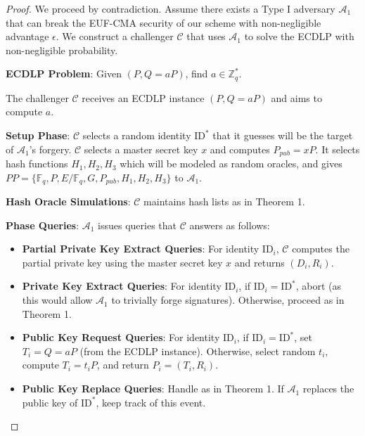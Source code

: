 \documentclass[10pt]{article}
\newtheorem{proof}{Proof}
\begin{document}
\begin{proof}
We proceed by contradiction. Assume there exists a Type I adversary $\mathcal{A}_1$ that can break the EUF-CMA security of our scheme with non-negligible advantage $\epsilon$. We construct a challenger $\mathcal{C}$ that uses $\mathcal{A}_1$ to solve the ECDLP with non-negligible probability.

\textbf{ECDLP Problem}: Given $(P, Q = aP)$, find $a \in \mathbb{Z}_q^*$.

The challenger $\mathcal{C}$ receives an ECDLP instance $(P, Q = aP)$ and aims to compute $a$.

\textbf{Setup Phase}:
$\mathcal{C}$ selects a random identity $\text{ID}^*$ that it guesses will be the target of $\mathcal{A}_1$'s forgery. $\mathcal{C}$ selects a master secret key $x$ and computes $P_{pub} = xP$. It selects hash functions $H_1, H_2, H_3$ which will be modeled as random oracles, and gives $PP = \{\mathbb{F}_q, P, E/\mathbb{F}_q, G, P_{pub}, H_1, H_2, H_3\}$ to $\mathcal{A}_1$.

\textbf{Hash Oracle Simulations}:
$\mathcal{C}$ maintains hash lists as in Theorem 1.

\textbf{Phase Queries}:
$\mathcal{A}_1$ issues queries that $\mathcal{C}$ answers as follows:

\begin{itemize}
    \item \textbf{Partial Private Key Extract Queries}: For identity $\text{ID}_i$, $\mathcal{C}$ computes the partial private key using the master secret key $x$ and returns $(D_i, R_i)$.
    
    \item \textbf{Private Key Extract Queries}: For identity $\text{ID}_i$, if $\text{ID}_i = \text{ID}^*$, abort (as this would allow $\mathcal{A}_1$ to trivially forge signatures). Otherwise, proceed as in Theorem 1.
    
    \item \textbf{Public Key Request Queries}: For identity $\text{ID}_i$, if $\text{ID}_i = \text{ID}^*$, set $T_i = Q = aP$ (from the ECDLP instance). Otherwise, select random $t_i$, compute $T_i = t_i P$, and return $P_i = (T_i, R_i)$.
    
    \item \textbf{Public Key Replace Queries}: Handle as in Theorem 1. If $\mathcal{A}_1$ replaces the public key of $\text{ID}^*$, keep track of this event.
    

\end{itemize}
\end{proof}
\end{document}
